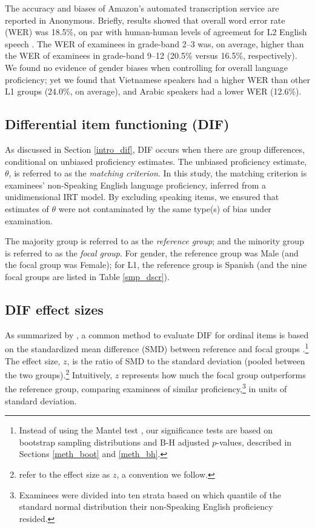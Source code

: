 \documentclass [PhD] {uclathes}
\begin{document}
The accuracy and biases of Amazon’s automated transcription service are reported in Anonymous. Briefly, results showed that overall word error rate (WER) was 18.5\%, on par with human-human levels of agreement for L2 English speech \citep{zechner2009}. The WER of examinees in grade-band 2–3 was, on average, higher than the WER of examinees in grade-band 9–12 (20.5\% versus 16.5\%, respectively). We found no evidence of gender biases when controlling for overall language proficiency; yet we found that Vietnamese speakers had a higher WER than other L1 groups (24.0\%, on average), and Arabic speakers had a lower WER (12.6\%). 

\subsection{Differential item functioning (DIF)}
\label{meth_dif}

As discussed in Section \ref{intro_dif}, DIF occurs when there are group differences, conditional on unbiased proficiency estimates. The unbiased proficiency estimate, $\theta$, is referred to as the \emph{matching criterion}. In this study, the matching criterion is examinees’ non-Speaking English language proficiency, inferred from a unidimensional IRT model. By excluding speaking items, we ensured that estimates of $\theta$ were not contaminated by the same type(s) of bias under examination. 

The majority group is referred to as the \emph{reference group}; and the minority group is referred to as the \emph{focal group}. For gender, the reference group was Male (and the focal group was Female); for L1, the reference group is Spanish (and the nine focal groups are listed in Table \ref{smp_dscr}). 

\subsection{DIF effect sizes}
\label{meth_fx}

As summarized by \cite{michaelides2008}, a common method to evaluate DIF for ordinal items is based on the standardized mean difference (SMD) between reference and focal groups \citep{dorans1986}.\footnote{Instead of using the Mantel test \citep{mantel1963}, our significance tests are based on bootstrap sampling distributions and B-H adjusted $p$-values, described in Sections \ref{meth_boot} and \ref{meth_bh}.} The effect size, $z$, is the ratio of SMD to the standard deviation (pooled between the two groups).\footnote{\cite{ormerod2022automated} refer to the effect size as $z$, a convention we follow.} Intuitively, $z$ represents how much the focal group outperforms the reference group, comparing examinees of similar proficiency,\footnote{Examinees were divided into ten strata based on which quantile of the standard normal distribution their non-Speaking English proficiency resided.} in units of standard deviation. 
\end{document}
